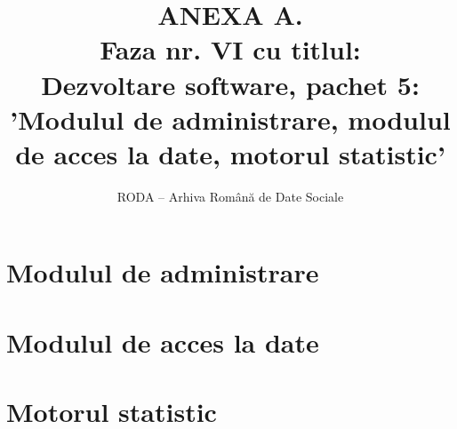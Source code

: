 \documentclass[11pt,twoside,romanian]{extbook}
\begin{document}
\fancyhead[RE,LO]{\thepage}


\title{ANEXA A.\\
Faza nr. VI 
cu titlul:\\
Dezvoltare software, pachet 5: 'Modulul de administrare, modulul de acces la date, motorul statistic'
}

\author{RODA -- Arhiva Rom\^{a}n\u{a} de Date Sociale}

\date{ }

\maketitle

\newpage
\thispagestyle{plain}
\tableofcontents{}
\setcounter{page}{1}

\chapter{Modulul de administrare}



\chapter{Modulul de acces la date}



\chapter{Motorul statistic}

 
\end{document}
